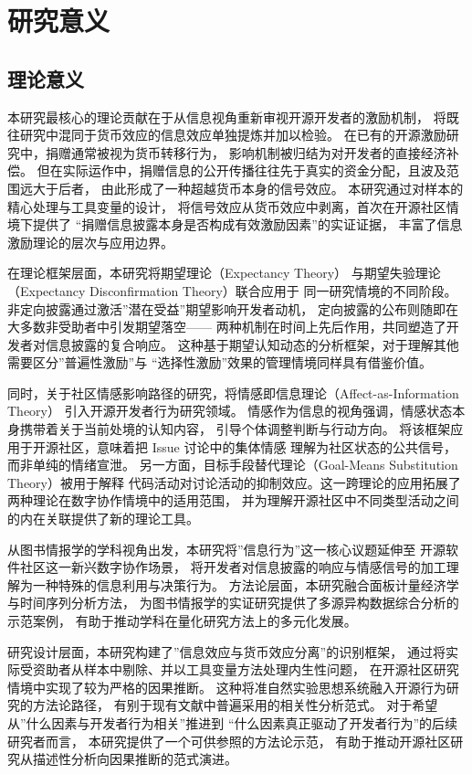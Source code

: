 \section{研究意义}

\subsection{理论意义}

本研究最核心的理论贡献在于从信息视角重新审视开源开发者的激励机制，
将既往研究中混同于货币效应的信息效应单独提炼并加以检验。
在已有的开源激励研究中，捐赠通常被视为货币转移行为，
影响机制被归结为对开发者的直接经济补偿\cite{zhang2022who,wang2022influence}。
但在实际运作中，捐赠信息的公开传播往往先于真实的资金分配，且波及范围远大于后者，
由此形成了一种超越货币本身的信号效应。
本研究通过对样本的精心处理与工具变量的设计，
将信号效应从货币效应中剥离，首次在开源社区情境下提供了
“捐赠信息披露本身是否构成有效激励因素”的实证证据，
丰富了信息激励理论的层次与应用边界。

在理论框架层面，本研究将期望理论（Expectancy Theory）
与期望失验理论（Expectancy Disconfirmation Theory）联合应用于
同一研究情境的不同阶段。非定向披露通过激活”潜在受益”期望影响开发者动机，
定向披露的公布则随即在大多数非受助者中引发期望落空——
两种机制在时间上先后作用，共同塑造了开发者对信息披露的复合响应。
这种基于期望认知动态的分析框架，对于理解其他需要区分”普遍性激励”与
“选择性激励”效果的管理情境同样具有借鉴价值。

同时，关于社区情感影响路径的研究，将情感即信息理论（Affect-as-Information Theory）
引入开源开发者行为研究领域。
情感作为信息的视角强调，情感状态本身携带着关于当前处境的认知内容，
引导个体调整判断与行动方向\cite{schwarz1983moods}。
将该框架应用于开源社区，意味着把 Issue 讨论中的集体情感
理解为社区状态的公共信号，而非单纯的情绪宣泄。
另一方面，目标手段替代理论（Goal-Means Substitution Theory）被用于解释
代码活动对讨论活动的抑制效应。这一跨理论的应用拓展了两种理论在数字协作情境中的适用范围，
并为理解开源社区中不同类型活动之间的内在关联提供了新的理论工具。

从图书情报学的学科视角出发，本研究将”信息行为”这一核心议题延伸至
开源软件社区这一新兴数字协作场景，
将开发者对信息披露的响应与情感信号的加工理解为一种特殊的信息利用与决策行为。
方法论层面，本研究融合面板计量经济学与时间序列分析方法，
为图书情报学的实证研究提供了多源异构数据综合分析的示范案例，
有助于推动学科在量化研究方法上的多元化发展。

研究设计层面，本研究构建了”信息效应与货币效应分离”的识别框架，
通过将实际受资助者从样本中剔除、并以工具变量方法处理内生性问题，
在开源社区研究情境中实现了较为严格的因果推断。
这种将准自然实验思想系统融入开源行为研究的方法论路径，
有别于现有文献中普遍采用的相关性分析范式。
对于希望从”什么因素与开发者行为相关”推进到
“什么因素真正驱动了开发者行为”的后续研究者而言，
本研究提供了一个可供参照的方法论示范，
有助于推动开源社区研究从描述性分析向因果推断的范式演进。

